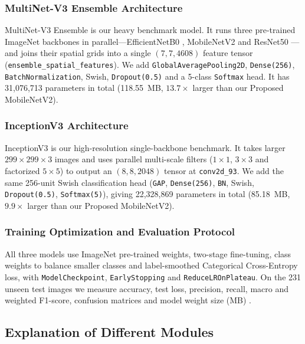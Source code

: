 \subsubsection{MultiNet-V3 Ensemble Architecture}
MultiNet-V3 Ensemble is our heavy benchmark model. It runs three pre-trained ImageNet backbones in parallel---EfficientNetB0 \cite{tan2019efficientnet}, MobileNetV2 \cite{sandler2018mobilenetv2} and ResNet50 \cite{he2016deep}---and joins their spatial grids into a single $(7, 7, 4608)$ feature tensor (\texttt{ensemble\_spatial\_features}). We add \texttt{GlobalAveragePooling2D}, \texttt{Dense(256)}, \texttt{BatchNormalization}, Swish, \texttt{Dropout(0.5)} and a 5-class \texttt{Softmax} head. It has 31,076,713 parameters in total (118.55~MB, $13.7\times$ larger than our Proposed MobileNetV2).

\subsubsection{InceptionV3 Architecture}
InceptionV3 \cite{szegedy2016rethinking} is our high-resolution single-backbone benchmark. It takes larger $299 \times 299 \times 3$ images and uses parallel multi-scale filters ($1\times 1$, $3\times 3$ and factorized $5\times 5$) to output an $(8, 8, 2048)$ tensor at \texttt{conv2d\_93}. We add the same 256-unit Swish classification head (\texttt{GAP}, \texttt{Dense(256)}, \texttt{BN}, Swish, \texttt{Dropout(0.5)}, \texttt{Softmax(5)}), giving 22,328,869 parameters in total (85.18~MB, $9.9\times$ larger than our Proposed MobileNetV2).

\subsubsection{Training Optimization and Evaluation Protocol}
All three models use ImageNet pre-trained weights, two-stage fine-tuning, class weights to balance smaller classes and label-smoothed Categorical Cross-Entropy loss, with \texttt{ModelCheckpoint}, \texttt{EarlyStopping} and \texttt{ReduceLROnPlateau}. On the 231 unseen test images we measure accuracy, test loss, precision, recall, macro and weighted F1-score, confusion matrices and model weight size (MB) \cite{grandini2020metrics}.

\subsection{Explanation of Different Modules}

